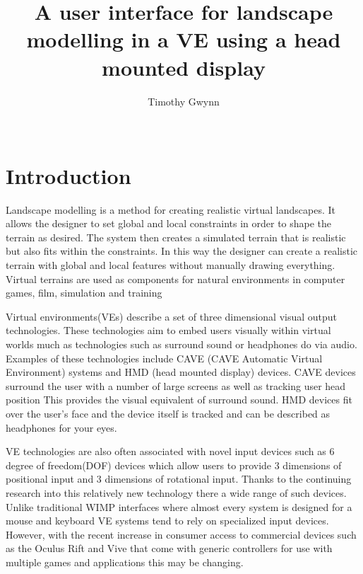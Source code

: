 \documentclass{sig-alternate-05-2015}
\begin{document}
\title{A user interface for landscape modelling in a VE using a head mounted display}

\author{
\alignauthor
Timothy Gwynn\\
       \\
}
\maketitle
\begin{CCSXML}

\end{CCSXML}



\printccsdesc
{}
\begin{abstract}
	
\end{abstract}
\section{Introduction}
Landscape modelling is a method for creating realistic virtual landscapes. It allows the designer to set global and local constraints in order to shape the terrain as desired. The system then creates a simulated terrain that is realistic but also fits within the constraints. In this way the designer can create a realistic terrain with global and local features without manually drawing everything. Virtual terrains are used as components for natural environments in computer games, film, simulation and training\cite{Gain2015}

Virtual environments(VEs) describe a set of three dimensional visual output technologies. These technologies aim to embed users visually within virtual worlds much as technologies such as surround sound or headphones do via audio. Examples of these technologies include CAVE (CAVE Automatic Virtual
Environment)  systems and HMD (head mounted display) devices.
CAVE devices surround the user with a number of large screens as well as tracking user head position\cite{Cruz-Neira1993} This provides the visual equivalent of surround sound. HMD devices fit over the user's face and the device itself is tracked and can be described as headphones for your eyes.\cite{alger2015visual}

VE technologies are also often associated with novel input devices such as 6 degree of freedom(DOF) devices which allow users to provide 3 dimensions of positional input and 3 dimensions of rotational input. Thanks to the continuing research into this relatively new technology there a wide range of such devices. Unlike traditional WIMP interfaces where almost every system is designed for a mouse and keyboard VE systems tend to rely on specialized input devices\cite{Hand1997,Bowman2001}. However, with the recent increase in consumer access to commercial devices such as the Oculus Rift and Vive that come with generic controllers for use with multiple games and applications this may be changing.
\end{document}
